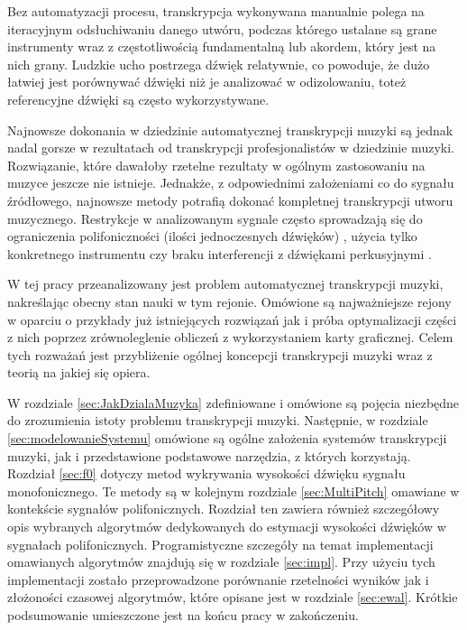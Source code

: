 \documentclass[12pt,a4paper,twoside]{mwart}
\begin{document}
Bez automatyzacji procesu, transkrypcja wykonywana manualnie polega na iteracyjnym odsłuchiwaniu danego utwóru, podczas którego ustalane są grane instrumenty wraz z częstotliwością fundamentalną lub akordem, który jest na nich grany.  Ludzkie ucho postrzega dźwięk relatywnie, co powoduje, że dużo łatwiej jest porównywać dźwięki niż je analizować w odizolowaniu, toteż referencyjne dźwięki są często wykorzystywane.

Najnowsze dokonania w dziedzinie automatycznej transkrypcji muzyki są jednak nadal gorsze w rezultatach od transkrypcji profesjonalistów w dziedzinie muzyki. Rozwiązanie, które dawałoby rzetelne rezultaty w ogólnym zastosowaniu na muzyce jeszcze nie istnieje. Jednakże, z odpowiednimi założeniami co do sygnału źródłowego, najnowsze metody potrafią dokonać kompletnej transkrypcji utworu muzycznego. Restrykcje w analizowanym sygnale często sprowadzają się do ograniczenia polifoniczności (ilości jednoczesnych dźwięków) 
\cite[1-2]{Transcription:BayesianHarmonicModels}
, użycia tylko konkretnego instrumentu \cite{Transcription:Hawthorne:OnsetsAndFrames} czy braku interferencji z dźwiękami perkusyjnymi \cite{Transcription:Kameoka:HarmonicSeparation}.

W tej pracy przeanalizowany jest problem automatycznej transkrypcji muzyki, nakreślając obecny stan nauki w tym rejonie. Omówione są najważniejsze rejony w oparciu o przykłady już istniejących rozwiązań jak i próba optymalizacji części z nich poprzez zrównoleglenie obliczeń z wykorzystaniem karty graficznej. Celem tych rozważań jest przybliżenie ogólnej koncepcji transkrypcji muzyki wraz z teorią na jakiej się opiera.

W rozdziale \ref{sec:JakDzialaMuzyka} zdefiniowane i omówione są pojęcia niezbędne do zrozumienia istoty problemu transkrypcji muzyki. Następnie, w rozdziale \ref{sec:modelowanieSystemu} omówione są ogólne założenia systemów transkrypcji muzyki, jak i przedstawione podstawowe narzędzia, z których korzystają. Rozdział \ref{sec:f0} dotyczy metod wykrywania wysokości dźwięku sygnału monofonicznego. Te metody są w kolejnym rozdziale \ref{sec:MultiPitch} omawiane w kontekście sygnałów polifonicznych. Rozdział ten zawiera również szczegółowy opis wybranych algorytmów dedykowanych do estymacji wysokości dźwięków w sygnałach polifonicznych. Programistyczne szczegóły na temat implementacji omawianych algorytmów znajdują się w rozdziale \ref{sec:impl}. Przy użyciu tych implementacji zostało przeprowadzone porównanie rzetelności wyników jak i złożoności czasowej algorytmów, które opisane jest w rozdziale \ref{sec:ewal}. Krótkie podsumowanie umieszczone jest na końcu pracy w zakończeniu. 
\end{document}
